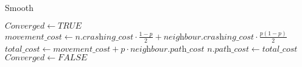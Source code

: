 \begin{algorithm}
    \caption{Smooth}
    \label{alg:flow}
\begin{algorithmic}[1]
        \State $Converged \gets TRUE$
                \State $\textit{movement\_cost} \gets n.\textit{crashing\_cost} \cdot \frac{1 - p}{2} +  \textit{neighbour}.\textit{crashing\_cost} \cdot \frac{p(1 - p)}{2}$
                \State $\textit{total\_cost} \gets \textit{movement\_cost} + p \cdot \textit{neighbour.path\_cost}$
                    \State $n.\textit{path\_cost} \gets \textit{total\_cost}$
                    \State $Converged \gets FALSE$
                \EndIf
            \EndFor
        \EndFor
    \EndWhile
\end{algorithmic}
\end{algorithm}